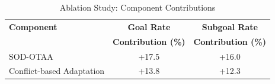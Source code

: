 \begin{table}[t]
\centering
\caption{Ablation Study: Component Contributions}
\label{tab:ablation}
\begin{tabular}{lcc}
\toprule
\textbf{Component} & \textbf{Goal Rate} & \textbf{Subgoal Rate} \\
 & \textbf{Contribution (\%)} & \textbf{Contribution (\%)} \\
\midrule
SOD-OTAA & +17.5 & +16.0 \\
Conflict-based Adaptation & +13.8 & +12.3 \\
\bottomrule
\end{tabular}
\end{table}
